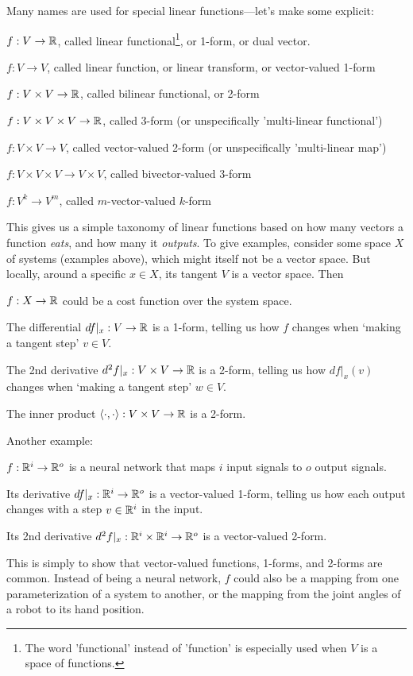 Many names are used for special linear functions---let's make some explicit:
\begin{items}
\item $f: V \to {\mathbb{R}}$, called linear
functional\footnote{The word 'functional' instead of 'function' is
especially used when $V$ is a space of functions.}, or 1-form, or dual vector.
\item $f: V \to V$, called linear function, or linear transform, or vector-valued 1-form
\item $f: V\times V \to {\mathbb{R}}$, called bilinear functional, or 2-form
\item $f: V\times V\times V  \to {\mathbb{R}}$, called 3-form (or
unspecifically 'multi-linear functional')
\item $f: V\times V \to V$, called vector-valued 2-form (or
unspecifically 'multi-linear map')
\item $f: V\times V \times V \to V \times V$, called bivector-valued 3-form
\item $f: V^k \to V^m$, called $m$-vector-valued $k$-form
\end{items}
This gives us a simple taxonomy of linear functions based on how many
vectors a function \emph{eats}, and how many it \emph{outputs}. To give
examples, consider some space $X$ of systems (examples above), which
might itself not be a vector space. But locally, around a specific
$x\in X$, its tangent $V$ is a vector space. Then
\begin{items}
\item $f: X \to {\mathbb{R}}$ could be a cost function over the system space.
\item The differential $df|_x: V \to {\mathbb{R}}$ is a 1-form, telling us how
$f$ changes when `making a tangent step' $v\in V$.
\item The 2nd derivative $d^2f|_x: V\times V \to {\mathbb{R}}$ is a 2-form,
telling us how $df|_x(v)$ changes when `making a tangent step' $w\in V$.
\item The inner product $\langle\cdot , \cdot \rangle: V\times V \to {\mathbb{R}}$ is a
2-form.
\end{items}
Another example:
\begin{items}
\item $f: {\mathbb{R}}^i \to {\mathbb{R}}^o$ is a neural network that maps $i$ input
signals to $o$ output signals.
\item Its derivative $df|_x: {\mathbb{R}}^i \to {\mathbb{R}}^o$ is a vector-valued
1-form, telling us how each output changes with a step $v\in{\mathbb{R}}^i$ in
the input.
\item Its 2nd derivative $d^2f|_x: {\mathbb{R}}^i \times {\mathbb{R}}^i \to {\mathbb{R}}^o$ is
a vector-valued 2-form.
\end{items}
This is simply to show that vector-valued functions, 1-forms, and 2-forms
are common. Instead of being a neural network, $f$ could also be
a mapping from one parameterization of a system to another, or the
mapping from the joint angles of a robot to its hand position.

